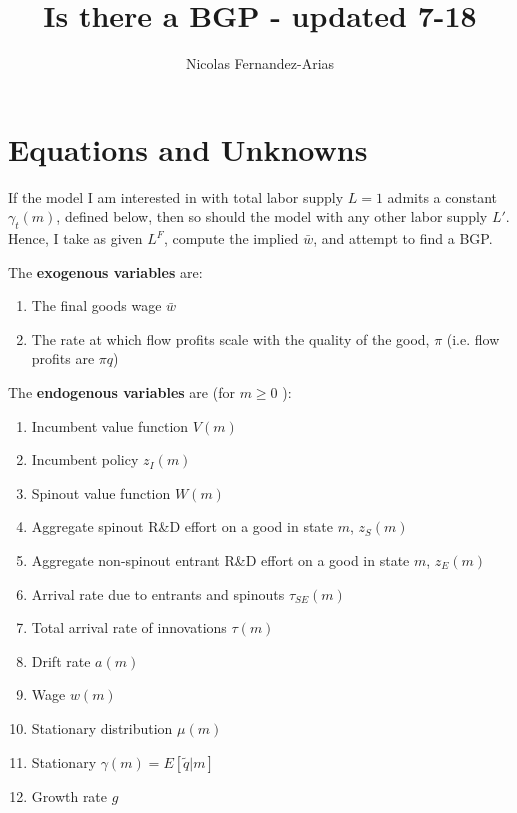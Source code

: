 \documentclass[12pt,english]{article}
\theoremstyle{remark}
\begin{document}
	
\title{Is there a BGP - updated 7-18}
\author{Nicolas Fernandez-Arias}
\maketitle

\section{Equations and Unknowns}

If the model I am interested in with total labor supply $L = 1$ admits a constant $\gamma_t(m)$, defined below, then so should the model with any other labor supply $L'$. Hence, I take as given $L^F$, compute the implied $\bar{w}$, and attempt to find a BGP. 

The \textbf{exogenous variables }are:
\begin{enumerate}
	\item The final goods wage $\bar{w}$
	\item The rate at which flow profits scale with the quality of the good, $\pi$ (i.e. flow profits are $\pi q $)
\end{enumerate}

The \textbf{endogenous variables }are \big(for $m \ge 0$ \big):
\begin{enumerate}
	\item Incumbent value function $V(m)$
	\item Incumbent policy $z_I(m)$
	\item Spinout value function $W(m)$
	\item Aggregate spinout R\&D effort on a good in state $m$, $z_S(m)$
	\item Aggregate non-spinout entrant R\&D effort on a good in state $m$, $z_E(m)$
	\item Arrival rate due to entrants and spinouts $\tau_{SE}(m)$
	\item Total arrival rate of innovations $\tau(m)$
	\item Drift rate $a(m)$
	\item Wage $w(m)$
	\item Stationary distribution $\mu(m)$ 
	\item Stationary $\gamma(m) = E[\tilde{q}|m]$
	\item Growth rate $g$
\end{enumerate}
\end{document}
